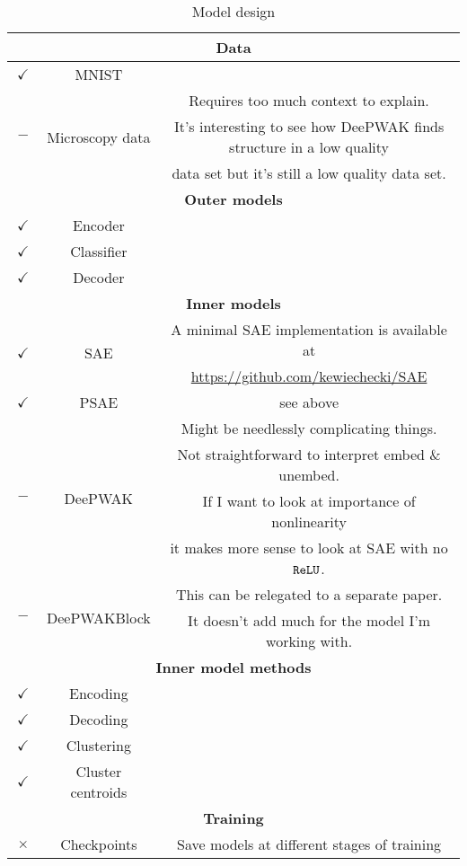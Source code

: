 \begin{table}[]
    \centering


\begin{tabular}{cc|c}


    \hline
    \multicolumn{3}{c}{\textbf{Data}} \\
    \hline
    $\boxed{\checkmark}$ & MNIST & \\ 
    \hline
    \multirow{3}{*}{$\boxed{-}$} & \multirow{3}{*}{Microscopy data} & 
    Requires too much context to explain. \\
    & & It's interesting to see how DeePWAK finds structure in a low quality \\
    & & data set but it's still a low quality data set. \\
    
    \hline
    \multicolumn{3}{c}{\textbf{Outer models}} \\
    \hline
    $\boxed{\checkmark}$ & Encoder & \\
    \hline
    $\boxed{\checkmark}$ & Classifier & \\
    \hline
    $\boxed{\checkmark}$ & Decoder & \\

    \hline
    \multicolumn{3}{c}{\textbf{Inner models}} \\
    \hline
    \multirow{2}{*}{$\boxed{\checkmark}$} & \multirow{2}{*}{SAE} &
    A minimal SAE implementation is available at \\
    & & \url{https://github.com/kewiechecki/SAE} \\
    \hline
    $\boxed{\checkmark}$ & PSAE & see above \\
    \hline
    \multirow{4}{*}{$\boxed{-}$} &  \multirow{4}{*}{DeePWAK} &
    Might be needlessly complicating things. \\
    & & Not straightforward to interpret embed \& unembed. \\
    & & If I want to look at importance of nonlinearity \\
    & & it makes more sense to look at SAE with no $\mathop{\mathtt{ReLU}}\limits$. \\
    \hline
    \multirow{2}{*}{$\boxed{-}$} & \multirow{2}{*}{DeePWAKBlock} &
    This can be relegated to a separate paper. \\
    & & It doesn't add much for the model I'm working with. \\
    \hline

    \multicolumn{3}{c}{\textbf{Inner model methods}} \\
    \hline
    $\boxed{\checkmark}$ & Encoding & \\
    \hline
    $\boxed{\checkmark}$ & Decoding & \\
    \hline
    $\boxed{\checkmark}$ & Clustering & \\
    \hline
    $\boxed{\checkmark}$ & Cluster centroids & \\
    \hline
    
    \multicolumn{3}{c}{\textbf{Training}} \\
    \hline
    $\boxed{\times}$ & Checkpoints & Save models at different stages of training \\
    \hline
\end{tabular}
    \caption{Model design}
    \label{tab:models}
\end{table}